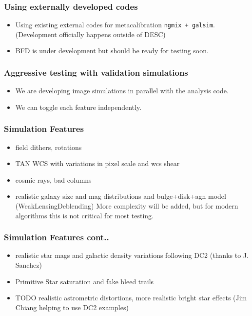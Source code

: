 \documentclass{beamer}
\begin{document}
\frame
{

    \frametitle{Using externally developed codes}

    \begin{itemize}

        \item Using existing external codes for metacalibration \texttt{ngmix + galsim}.  (Development
            officially happens outside of DESC)

        \item BFD is under development but should be ready for testing soon.

    \end{itemize}

}

\frame
{

    \frametitle{Aggressive testing with validation simulations}

    \begin{itemize}

        \item We are developing image simulations in parallel with the analysis code.
        \item We can toggle each feature independently.

    \end{itemize}

}

\frame
{

    \frametitle{Simulation Features}


    \begin{itemize}

                \item field dithers, rotations
                \item TAN WCS with variations in pixel scale and wcs shear
                \item cosmic rays, bad columns
                \item realistic galaxy size and mag distributions and bulge+disk+agn model
                  (WeakLensingDeblending) More complexity will be added, but for
                  modern algorithms this is not critical for most testing.
    \end{itemize}
}

\frame
{

    \frametitle{Simulation Features cont..}


            \begin{itemize}
              \item realistic star mags and galactic density variations following DC2 (thanks to J. Sanchez)
                \item Primitive Star saturation and fake bleed trails
                \item TODO realistic astrometric distortions, more realistic bright star
                  effects (Jim Chiang helping to use DC2 examples)
            \end{itemize}
}
\end{document}
